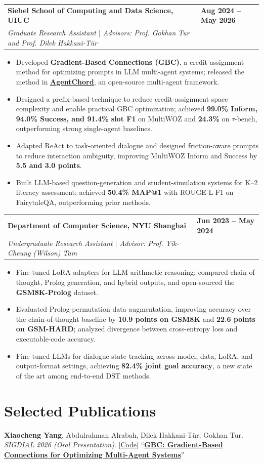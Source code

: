 \documentclass[letterpaper]{article}
\makeatletter
\newcommand{\researchentry}[4]{%
  \begin{tabularx}{\textwidth}{@{}>{\RaggedRight\arraybackslash}X>{\RaggedLeft\arraybackslash}p{1.55in}@{}}
    \textbf{#1} & \textbf{#2} \\
    \textit{#3} & \textit{#4}
  \end{tabularx}\vspace{-0.5pt}
}
\newcommand{\pub}[4]{%
  #1 #2 ``\href{#4}{\textbf{#3}}''\par\vspace{1.8pt}
}
\makeatother
\begin{document}
\researchentry{Siebel School of Computing and Data Science, UIUC}{Aug 2024 -- May 2026}
              {Graduate Research Assistant $\vert$ Advisors: Prof. Gokhan Tur and Prof. Dilek Hakkani-Tür}{}
\begin{itemize}
  \item Developed \textbf{Gradient-Based Connections (GBC)}, a credit-assignment method for optimizing prompts in LLM multi-agent systems; released the method in \href{https://github.com/yxc-cyber/AgentChord}{\textbf{AgentChord}}, an open-source multi-agent framework.
  \item Designed a prefix-based technique to reduce credit-assignment space complexity and enable practical GBC optimization; achieved \textbf{99.0\% Inform, 94.0\% Success, and 91.4\% slot F1} on MultiWOZ and \textbf{24.3\%} on $\tau$-bench, outperforming strong single-agent baselines.
  \item Adapted ReAct to task-oriented dialogue and designed friction-aware prompts to reduce interaction ambiguity, improving MultiWOZ Inform and Success by \textbf{5.5 and 3.0 points}.
  \item Built LLM-based question-generation and student-simulation systems for K--2 literacy assessment; achieved \textbf{50.4\% MAP@1} with ROUGE-L F1 on FairytaleQA, outperforming prior methods.
\end{itemize}

\researchentry{Department of Computer Science, NYU Shanghai}{Jun 2023 -- May 2024}
              {Undergraduate Research Assistant $\vert$ Advisor: Prof. Yik-Cheung (Wilson) Tam}{}
\begin{itemize}
  \item Fine-tuned LoRA adapters for LLM arithmetic reasoning; compared chain-of-thought, Prolog generation, and hybrid outputs, and open-sourced the \textbf{GSM8K-Prolog} dataset.
  \item Evaluated Prolog-permutation data augmentation, improving accuracy over the chain-of-thought baseline by \textbf{10.9 points on GSM8K} and \textbf{22.6 points on GSM-HARD}; analyzed divergence between cross-entropy loss and executable-code accuracy.
  \item Fine-tuned LLMs for dialogue state tracking across model, data, LoRA, and output-format settings, achieving \textbf{82.4\% joint goal accuracy}, a new state of the art among end-to-end DST methods.
\end{itemize}

\section{Selected Publications}
\pub{\textbf{Xiaocheng Yang}, Abdulrahman Alrabah, Dilek Hakkani-Tür, Gokhan Tur.}
    {\textit{SIGDIAL 2026 (Oral Presentation)}. \href{https://github.com/yxc-cyber/AgentChord}{[Code]}}
    {GBC: Gradient-Based Connections for Optimizing Multi-Agent Systems}
    {https://aclanthology.org/2026.sigdial-1.24/}
\end{document}
